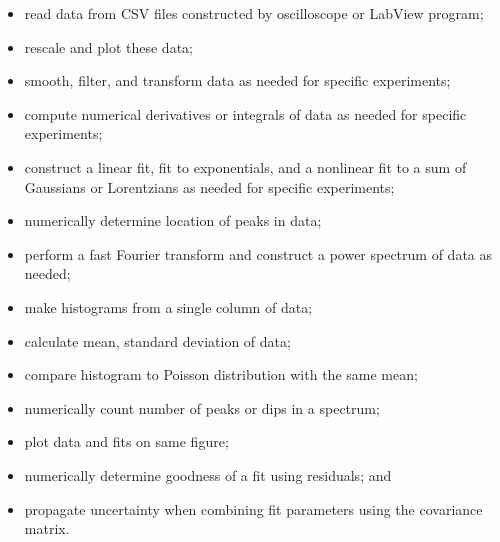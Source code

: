 \documentclass[graybox,envcountchap,sectrefs]{svmult}
\begin{document}
\begin{itemize}
\item read data from CSV files constructed by oscilloscope or LabView program;

\item rescale and plot these data;

\item smooth, filter, and transform data as needed for specific experiments;

\item compute numerical derivatives or integrals of data as needed for specific experiments;

\item construct a linear fit, fit to exponentials, and a nonlinear fit to a sum of Gaussians or Lorentzians as needed for specific experiments;

\item numerically determine location of peaks in data;

\item perform a fast Fourier transform and construct a power spectrum of data as needed;

\item make histograms from a single column of data;

\item calculate mean, standard deviation of data;

\item compare histogram to Poisson distribution with the same mean;

\item numerically count number of peaks or dips in a spectrum;

\item plot data and fits on same figure;

\item numerically determine goodness of a fit using residuals; and

\item propagate uncertainty when combining fit parameters using the covariance matrix.
\end{itemize}
\end{document}
